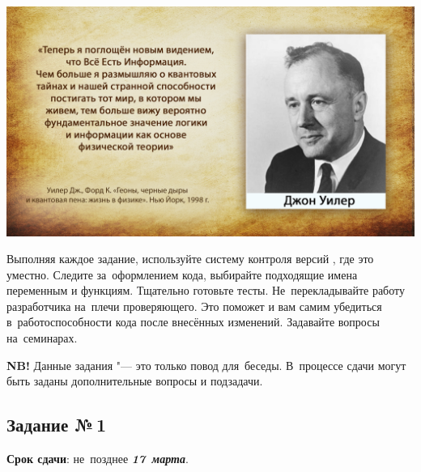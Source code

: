 \documentclass[a4paper,11pt,landscape,notitlepage,oneside,openany,final]{memoir}
\begin{document}



\newcommand{\tabheaderitem}[2]{\multicolumn{1}{#1}{\multirow{2}{*}{#2}}}

\newcommand*{\task}[1]{\makebox[3.0cm]{з. #1}}

\newcommand*{\groupmark}[1]{\textit{группа \textbf{#1}}}
\newcommand*{\groupsection}[1]{\AbstractSection{Группа №\,\textbf{#1}}}

\newcommand*{\pd}{\text{\(+\)\hspace{-3pt}.}}
\newcommand*{\md}{\text{\(-\)\hspace{-3pt}.}}

\newcommand*{\deadline}[1]{\textit{\bfseries\color{DarkRed!60}#1}}
\newcommand*{\notabene}[1]{\textit{\bfseries\color{DarkRed!70}#1}}


\clearpage
\noindent
\includegraphics[width=\textwidth]{images/Джон-Уилер_RU.jpg}


\clearpage
\renewcommand{\rightmark}{Задания}
Выполняя каждое задание, используйте систему контроля версий \git{}, где это уместно. Следите за~оформлением кода, выбирайте подходящие имена переменным и функциям. Тщательно готовьте тесты. Не~перекладывайте работу разработчика на~плечи проверяющего. Это поможет и вам самим убедиться в~работоспособности кода после внесённых изменений. Задавайте вопросы на~семинарах.

\textbf{NB!} Данные задания "--- это только повод для~беседы. В~процессе сдачи могут быть заданы дополнительные вопросы и подзадачи.



\subsection{Задание №\,1}
\textbf{Срок сдачи}: не~позднее \deadline{17~марта}.
\end{document}
